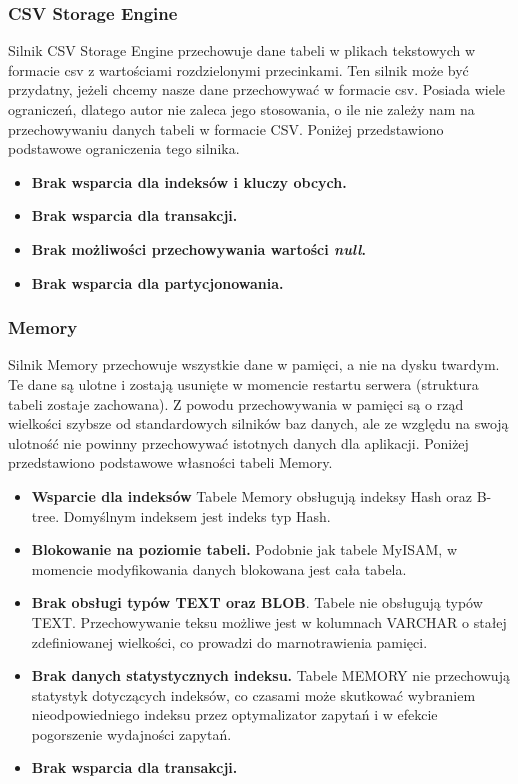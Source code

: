 \subsubsection{CSV Storage Engine}
Silnik CSV Storage Engine przechowuje dane tabeli w plikach tekstowych w formacie csv z wartościami rozdzielonymi przecinkami. Ten silnik może być przydatny, jeżeli chcemy nasze dane przechowywać w formacie csv. Posiada wiele ograniczeń, dlatego autor nie zaleca jego stosowania, o ile nie zależy nam na przechowywaniu danych tabeli w formacie CSV.
Poniżej przedstawiono podstawowe ograniczenia tego silnika.
\begin{itemize}
	\item \textbf{Brak wsparcia dla indeksów i kluczy obcych.}
	\item \textbf{Brak wsparcia dla transakcji.}
	\item \textbf{Brak możliwości przechowywania wartości \textit{null}.}
	\item \textbf{Brak wsparcia dla partycjonowania.}
\end{itemize}

\subsubsection{Memory}
Silnik Memory przechowuje wszystkie dane w pamięci, a nie na dysku twardym. Te dane są ulotne i zostają usunięte w momencie restartu serwera (struktura tabeli zostaje zachowana). Z powodu przechowywania w pamięci są o rząd wielkości szybsze od standardowych silników baz danych, ale ze względu na swoją ulotność nie powinny przechowywać istotnych danych dla aplikacji.
Poniżej przedstawiono podstawowe własności tabeli Memory.
\begin{itemize}
	\item \textbf{Wsparcie dla indeksów} Tabele Memory obsługują indeksy Hash oraz B-tree. Domyślnym indeksem jest indeks typ Hash.
	\item \textbf{Blokowanie na poziomie tabeli.} Podobnie jak tabele MyISAM, w momencie modyfikowania danych blokowana jest cała tabela.
	\item \textbf{Brak obsługi typów TEXT oraz BLOB}. Tabele nie obsługują typów TEXT. Przechowywanie teksu możliwe jest w kolumnach VARCHAR o stałej zdefiniowanej wielkości, co prowadzi do marnotrawienia pamięci.
	\item \textbf{Brak danych statystycznych indeksu.} Tabele MEMORY nie przechowują statystyk dotyczących indeksów, co czasami może skutkować wybraniem nieodpowiedniego indeksu przez optymalizator zapytań i w efekcie pogorszenie wydajności zapytań.
	\item \textbf{Brak wsparcia dla transakcji.}
\end{itemize}

